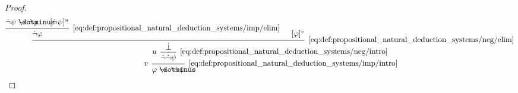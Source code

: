 \begin{proof}
  \begin{equation*}
    \begin{prooftree}
      \hypo{ \synneg \psi \synimplies \synneg \varphi }
      \hypo{ [\synneg \psi]^u }
      \infer2[\ref{eq:def:propositional_natural_deduction_systems/imp/elim}]{ \synneg \varphi }

      \hypo{ [\varphi]^v }
      \infer2[\ref{eq:def:propositional_natural_deduction_systems/neg/elim}]{ \synbot }

      \infer[left label=\( u \)]1[\ref{eq:def:propositional_natural_deduction_systems/neg/intro}]{ \synneg \synneg \psi }
      \infer[left label=\( v \)]1[\ref{eq:def:propositional_natural_deduction_systems/imp/intro}]{ \varphi \synimplies \synneg \synneg \psi }
    \end{prooftree}
  \end{equation*}
\end{proof}

